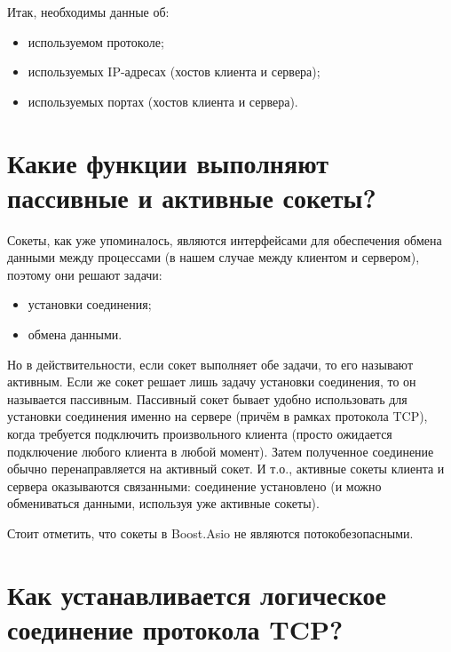 \documentclass[a4paper,12pt]{article}	%
\begin{document}
	Итак, необходимы данные об:
	
	\begin{itemize}
	
		\item используемом протоколе;
		
		\item используемых IP-адресах (хостов клиента и сервера);
		
		\item используемых портах (хостов клиента и сервера).
	
	\end{itemize}
	
	
\section{Какие функции выполняют пассивные и активные сокеты?}

	Сокеты, как уже упоминалось, являются интерфейсами для обеспечения обмена данными между процессами (в нашем случае между клиентом и сервером), поэтому они решают задачи:

	\begin{itemize}
	
		\item установки соединения;
		
		\item обмена данными.
			
	\end{itemize}	

	Но в действительности, если сокет выполняет обе задачи, то его называют активным. Если же сокет решает лишь задачу установки соединения, то он называется пассивным. Пассивный сокет бывает удобно использовать для установки соединения именно на сервере (причём в рамках протокола TCP), когда требуется подключить произвольного клиента (просто ожидается подключение любого клиента в любой момент). Затем полученное соединение обычно перенаправляется на активный сокет. И т.о., активные сокеты клиента и сервера оказываются связанными: соединение установлено (и можно обмениваться данными, используя уже активные сокеты).
	
	Стоит отметить, что сокеты в Boost.Asio не являются потокобезопасными.
	
	
		
\section{Как устанавливается логическое соединение протокола TCP?}
	
\end{document}
